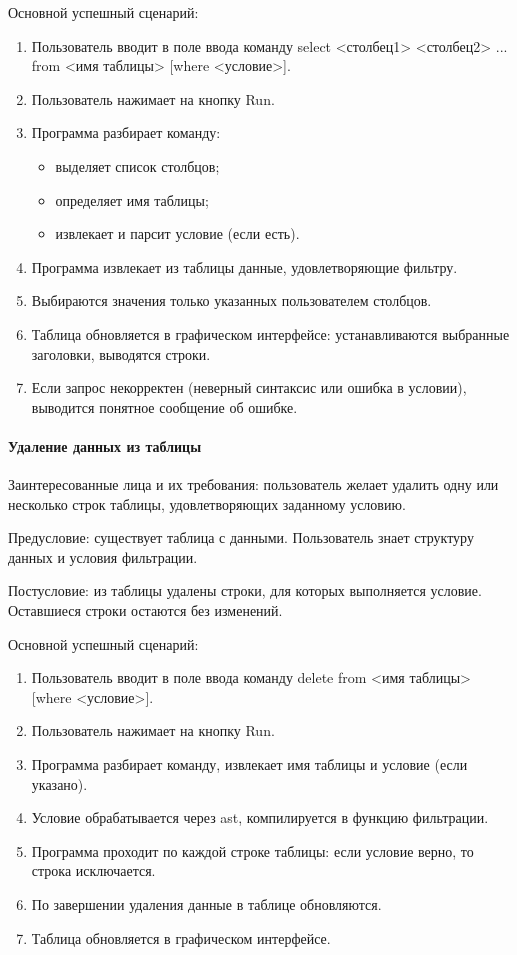 Основной успешный сценарий:
\begin{enumerate}
	\item Пользователь вводит в поле ввода команду select <столбец1> <столбец2> ... from <имя таблицы> [where <условие>].
	\item Пользователь нажимает на кнопку Run.	
	\item Программа разбирает команду:
	\begin{itemize}
		\item выделяет список столбцов;		
		\item определяет имя таблицы;		
		\item извлекает и парсит условие (если есть).
	\end{itemize}
	\item Программа извлекает из таблицы данные, удовлетворяющие фильтру.	
	\item Выбираются значения только указанных пользователем столбцов.	
	\item Таблица обновляется в графическом интерфейсе: устанавливаются выбранные заголовки, выводятся строки.	
	\item Если запрос некорректен (неверный синтаксис или ошибка в условии), выводится понятное сообщение об ошибке.
\end{enumerate}

\paragraph{Удаление данных из таблицы}

Заинтересованные лица и их требования: пользователь желает удалить одну или несколько строк таблицы, удовлетворяющих заданному условию.

Предусловие: существует таблица с данными. Пользователь знает структуру данных и условия фильтрации.

Постусловие: из таблицы удалены строки, для которых выполняется условие. Оставшиеся строки остаются без изменений.

Основной успешный сценарий:
\begin{enumerate}
	\item Пользователь вводит в поле ввода команду delete from <имя таблицы> [where <условие>].
	\item Пользователь нажимает на кнопку Run.		
	\item Программа разбирает команду, извлекает имя таблицы и условие (если указано).	
	\item Условие обрабатывается через ast, компилируется в функцию фильтрации.	
	\item Программа проходит по каждой строке таблицы: если условие верно, то строка исключается.	
	\item По завершении удаления данные в таблице обновляются.	
	\item Таблица обновляется в графическом интерфейсе.
\end{enumerate}

